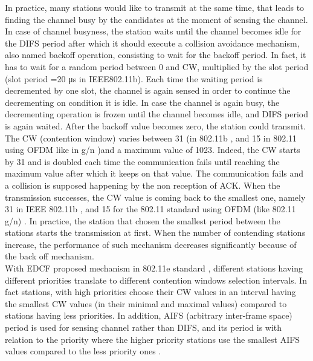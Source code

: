 \documentclass[journal,transmag]{IEEEtran}
\begin{document}
In practice, many stations would like to transmit at the same time, that leads to finding the channel busy by the candidates at the moment of sensing the channel. In case of channel busyness, the station waits until the channel becomes idle for the DIFS period after which it should execute a collision avoidance mechanism, also named backoff operation, consisting to wait for the backoff period. In fact, it has to wait for a random period between 0 and CW, multiplied by the slot period (slot period =20 μs in IEEE802.11b). Each time the waiting period is decremented by one slot, the channel is again sensed in order to continue the decrementing on condition it is idle. In case the channel is again busy, the decrementing operation is frozen until the channel becomes idle, and DIFS period is again waited. After the backoff value becomes zero, the station could transmit. The CW (contention window) varies between 31 (in 802.11b \cite{15time_fairness_MAC}, and 15 in 802.11 using OFDM like in g/n \cite{16standard_802.11})and a maximum value of 1023. Indeed, the CW starts by 31 and is doubled each time the communication fails until reaching the maximum value after which it keeps on that value. The communication fails and a collision is supposed happening by the non reception of ACK. When the transmission successes, the CW value is coming back to the smallest one, namely 31 in IEEE 802.11b \cite{15time_fairness_MAC}, and 15 for the 802.11 standard using OFDM (like 802.11 g/n) \cite{16standard_802.11}. In practice, the station that chosen the smallest period between the stations starts the transmission at first. When the number of contending stations increase, the performance of such mechanism decreases significantly because of the back off mechanism.\\

With EDCF proposed mechanism in 802.11e standard \cite{11user_centric_management_WLAN}, different stations having different priorities translate to different contention windows selection intervals. In fact stations, with high priorities choose their CW values in an interval having the smallest CW values (in their minimal and maximal values) compared to stations having less priorities. In addition, AIFS (arbitrary inter-frame space) period is used for sensing channel rather than DIFS, and its period is with relation to the priority where the higher priority stations use the smallest AIFS values compared to the less priority ones \cite{05load_balancing_802.11e}. 
\end{document}
